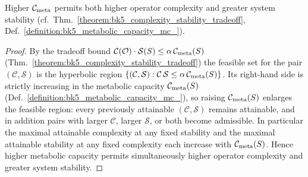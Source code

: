 \begin{corollary}
\label{corollary:bk5_complexity_stability_tradeoff}
Higher $\mathcal{C}_{\text{meta}}$ permits both higher operator complexity and greater system stability (cf.~Thm.~\ref{theorem:bk5_complexity_stability_tradeoff}, Def.~\ref{definition:bk5_metabolic_capacity_mc_}).
\end{corollary}
\begin{proof}
\label{proof:bk5_complexity_stability_tradeoff_cor}
\leavevmode
By the tradeoff bound $\mathcal{C}(\mathcal{O})\cdot\mathcal{S}(S)\le\alpha\,\mathcal{C}_{\text{meta}}(S)$ (Thm.~\ref{theorem:bk5_complexity_stability_tradeoff}) the feasible set for the pair $(\mathcal{C},\mathcal{S})$ is the hyperbolic region $\{(\mathcal{C},\mathcal{S}):\mathcal{C}\,\mathcal{S}\le\alpha\,\mathcal{C}_{\text{meta}}(S)\}$. Its right-hand side is strictly increasing in the metabolic capacity $\mathcal{C}_{\text{meta}}(S)$ (Def.~\ref{definition:bk5_metabolic_capacity_mc_}), so raising $\mathcal{C}_{\text{meta}}(S)$ enlarges the feasible region: every previously attainable $(\mathcal{C},\mathcal{S})$ remains attainable, and in addition pairs with larger $\mathcal{C}$, larger $\mathcal{S}$, or both become admissible. In particular the maximal attainable complexity at any fixed stability and the maximal attainable stability at any fixed complexity each increase with $\mathcal{C}_{\text{meta}}(S)$. Hence higher metabolic capacity permits simultaneously higher operator complexity and greater system stability.
\end{proof}
